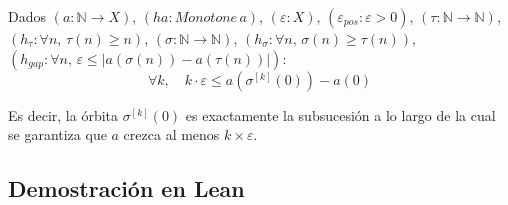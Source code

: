 \begin{theorem}
Dados $(a : \mathbb{N} \to X)$, $(ha : \mathit{Monotone}\, a)$,
$(\varepsilon : X)$, $(\varepsilon_{\mathit{pos}} : \varepsilon > 0)$,
$(\tau : \mathbb{N} \to \mathbb{N})$,
$(h_\tau : \forall n,\, \tau(n) \geq n)$,
$(\sigma : \mathbb{N} \to \mathbb{N})$,
$(h_\sigma : \forall n,\, \sigma(n) \geq \tau(n))$,
$(h_{\mathit{gap}} : \forall n,\, \varepsilon \leq |a(\sigma(n)) - a(\tau(n))|)$:
\[
  \forall k,\quad k \cdot \varepsilon \leq a(\sigma^{[k]}(0)) - a(0)
\]

Es decir, la órbita $\sigma^{[k]}(0)$ es exactamente la subsucesión a lo
largo de la cual se garantiza que $a$ crezca al menos $k \times
\varepsilon$.
\end{theorem}

\subsection{Demostración en Lean}

